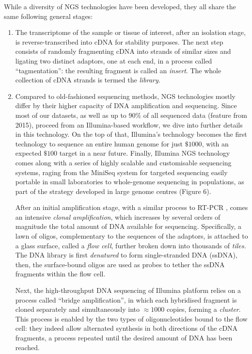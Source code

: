 While a diversity of NGS technologies have been developed, they all share the same following general stages:
\begin{enumerate}[label=(\roman*)]
    \item[Library preparation:] The transcriptome of the sample or tissue of interest, after an isolation stage, is reverse-transcribed into \gls{cDNA} for stability purposes. The next step consists of randomly fragmenting cDNA into strands of similar sizes     
    and ligating two distinct adaptors, one at each end, in a process called \enquote{tagmentation}: the resulting fragment is called an \textit{insert}. The whole collection of cDNA strands is termed the \textit{library}.
    \item[DNA amplification:] Compared to old-fashioned sequencing methods, NGS technologies mostly differ by their higher capacity of DNA amplification and sequencing. Since most of our datasets, as well as up to $90\%$ of all sequenced data (feature from 2015), proceed from an Illumina-based workflow, we dive into further details in this technology. On the top of that, Illumina's technology becomes the first technology to sequence an entire human genome for just $\$1000$, with an expected $\$100$ target in a near future. Finally, Illumina NGS technology comes along with a series of highly scalable and customisable sequencing systems, raging from the MiniSeq system for targeted sequencing easily portable in small laboratories to whole-genome sequencing in populations, as part of the strategy developed in large genome centres (Figure 6).
    
    After an initial amplification stage, with a similar process to RT-PCR , comes an intensive \textit{clonal amplification}, which increases by several orders of magnitude the total amount of DNA available for sequencing. 
    Specifically, a lawn of oligos, complementary to the sequences of the adaptors, is attached to a glass surface, called a \textit{flow cell}, further broken down into thousands of \textit{tiles.} The DNA library is first \textit{denatured} to form single-stranded DNA (ssDNA), then, the surface-bound oligos are used as probes to tether the ssDNA fragments within the flow cell. 
    
    Next, the high-throughput DNA sequencing of Illumina platform relies on a process called \enquote{bridge amplification}, in which each hybridised fragment is cloned separately and simultaneously into $\approx 1000$ copies, forming a \textit{cluster}. This process is enabled by the two types of oligonucleotides bound to the flow cell: they indeed allow alternated synthesis in both directions of the cDNA fragments, a process repeated until the desired amount of DNA has been reached. 
    

\end{enumerate}
